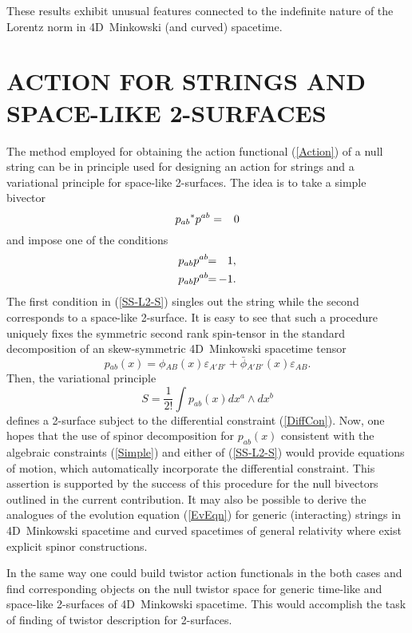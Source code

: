 \documentclass[a4paper,twocolumn,showkeys,showpacs,aps]{revtex4}
\begin{document}
These results exhibit unusual features connected to the indefinite
nature of the Lorentz norm in 4D~Minkowski (and curved) spacetime.

\section{ACTION FOR STRINGS AND SPA\-CE-LI\-KE 2-SURFACES}

The method employed for obtaining the action functional
(\ref{Action}) of a null string can be in principle used for
designing an action for strings and a variational principle for
space-like 2-surfaces. The idea is to take a simple bivector
\begin{equation}
p_{ab}{}^*p{}^{ab}=\hphantom{-}0%
\label{Simple}
\end{equation}
and impose one of the conditions
\begin{eqnarray}
p_{ab}p{}^{ab}\!\! & = &\!\!\!\!\! \hphantom{-}1, \nonumber \\
p_{ab}p{}^{ab}\!\! & = &\!\!\!\!\! -1.%
\label{SS-L2-S}
\end{eqnarray}
The first condition in (\ref{SS-L2-S}) singles out the string
while the second corresponds to a space-like 2-surface. It is easy
to see that such a procedure uniquely fixes the symmetric second
rank spin-tensor in the standard decomposition of an
skew-symmetric 4D~Minkowski spacetime tensor
\begin{equation}
p{}_{ab}(x)=\phi{}_{AB}(x)\varepsilon{}_{A'B'} +
\bar{\phi}{}_{A'B'}(x)\varepsilon{}_{AB}.
\end{equation}
Then, the variational principle
\begin{equation}
S = \frac{1}{2!}\int p_{ab}(x)dx^a \wedge dx^b
\end{equation}
defines a 2-surface subject to the differential constraint
(\ref{DiffCon}). Now, one hopes that the use of spinor
decomposition for $p_{ab}(x)$ consistent with the algebraic
constraints (\ref{Simple}) and either of (\ref{SS-L2-S}) would
provide equations of motion, which automatically incorporate the
differential constraint. This assertion is supported by the
success of this procedure for the null bivectors outlined in the
current contribution. It may also be possible to derive the
analogues of the evolution equation (\ref{EvEqn}) for generic
(interacting) strings in 4D~Minkowski spacetime and curved
spacetimes of general relativity where exist explicit spinor
constructions.

In the same way one could build twistor action functionals in the
both cases and find corresponding objects on the null twistor
space for generic time-like and space-like 2-surfaces of
4D~Minkowski spacetime. This would accomplish the task of finding
of twistor description for 2-surfaces.
\end{document}
